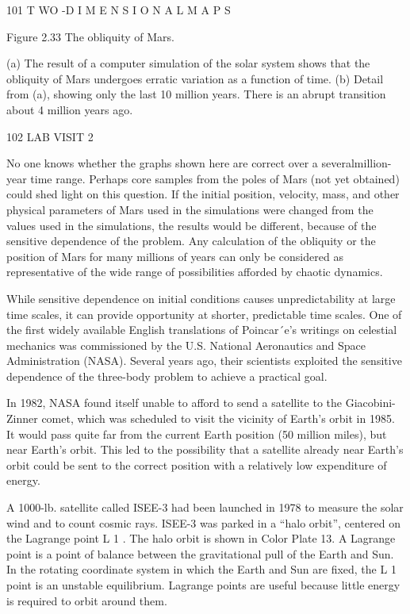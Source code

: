 \documentclass[12pt]{article}
\begin{document}
{101 T WO -D I M E N S I O N A L M A P S

Figure 2.33 The obliquity of Mars.

(a) The result of a computer simulation of the solar system shows that the obliquity of Mars undergoes erratic variation as a 
function of time. (b) Detail from (a), showing only the last 10 million years. There is an abrupt transition about 4 million years 
ago.

102 LAB VISIT 2

No one knows whether the graphs shown here are correct over a severalmillion-year time range. Perhaps core samples from the poles of 
Mars (not yet obtained) could shed light on this question. If the initial position, velocity, mass, and other physical parameters of 
Mars used in the simulations were changed from the values used in the simulations, the results would be different, because of the 
sensitive dependence of the problem. Any calculation of the obliquity or the position of Mars for many millions of years can only be 
considered as representative of the wide range of possibilities afforded by chaotic dynamics.

While sensitive dependence on initial conditions causes unpredictability at large time scales, it can provide opportunity at shorter, 
predictable time scales. One of the ﬁrst widely available English translations of Poincar´e’s writings on celestial mechanics was 
commissioned by the U.S. National Aeronautics and Space Administration (NASA). Several years ago, their scientists exploited the 
sensitive dependence of the three-body problem to achieve a practical goal.

In 1982, NASA found itself unable to afford to send a satellite to the Giacobini-Zinner comet, which was scheduled to visit the 
vicinity of Earth’s orbit in 1985. It would pass quite far from the current Earth position (50 million miles), but near Earth’s 
orbit. This led to the possibility that a satellite already near Earth’s orbit could be sent to the correct position with a 
relatively low expenditure of energy.

A 1000-lb. satellite called ISEE-3 had been launched in 1978 to measure the solar wind and to count cosmic rays. ISEE-3 was parked in 
a “halo orbit”, centered on the Lagrange point L 1 . The halo orbit is shown in Color Plate 13. A Lagrange point is a point of 
balance between the gravitational pull of the Earth and Sun. In the rotating coordinate system in which the Earth and Sun are ﬁxed, 
the L 1 point is an unstable equilibrium. Lagrange points are useful because little energy is required to orbit around them.

}
\end{document}
